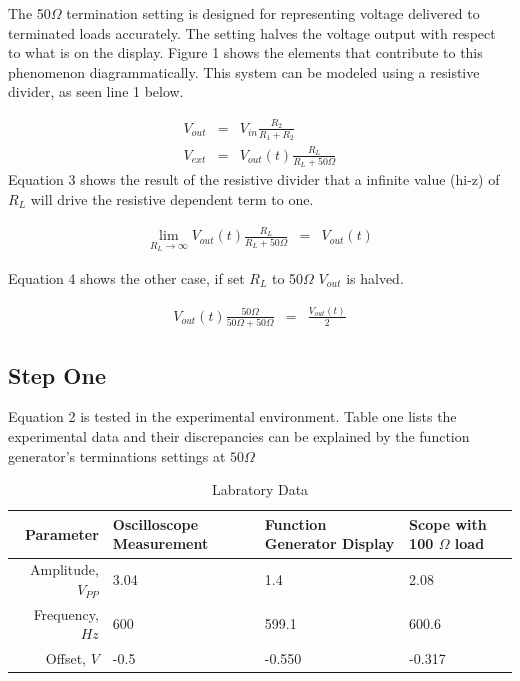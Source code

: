 \documentclass[11pt,journal]{IEEEtran}
\begin{document}
	The 50$\Omega$ termination setting is designed for representing voltage delivered to terminated loads accurately. The setting halves the voltage output 
	with respect to what is on the display. Figure 1 shows the elements that contribute to this phenomenon diagrammatically. This system can be modeled using 
	a resistive divider, as seen line 1 below. 
	
	\begin{eqnarray}
		V_{out} &=& V_{in} \frac{R_2}{R_1 + R_2}\\
		V_{ext} &=& V_{out}(t)\frac{R_L}{R_L + 50\Omega}
	\end{eqnarray}
	Equation 3 shows the result of the resistive divider that a infinite value (hi-z) of $R_L$ will drive the resistive dependent term to one.

	\begin{eqnarray}
		\lim_{R_L \rightarrow \infty} V_{out}(t)\frac{R_L}{R_L + 50\Omega} &=& V_{out}(t)
	\end{eqnarray}
	
	Equation 4 shows the other case, if set $R_L$ to 50$\Omega$ $V_{out}$ is halved. 
	
	\begin{eqnarray}
		V_{out}(t) \frac{50\Omega}{50\Omega + 50\Omega} &=& \frac{V_{out}(t)}{2}
	\end{eqnarray}
	
		\subsection{Step One}
		
			Equation 2 is tested in the experimental environment. Table one lists the 
		experimental data and their discrepancies can be explained by the function generator's
		terminations settings at $50\Omega$
		
		\begin{table}[htpb]
			\renewcommand{\arraystretch}{1.2}
			\caption{Labratory Data}
			
			\label{Team Hour Summary}
			\centering
			\begin{tabular}{r|p{1.7cm}|p{1.8cm}| p{1.5cm}}
			\hline
			\bfseries 	Parameter	 					&  \bf Oscilloscope Measurement			& \bfseries Function Generator Display 		& \bfseries Scope with 100 $\Omega$ load	\\
			\hline\hline
						Amplitude,  $V_{PP}$			& 3.04									& 1.4										& 2.08		\\
						Frequency, $Hz$					& 600									& 599.1										& 600.6		\\	
						Offset, $V$						& -0.5									& -0.550									& -0.317	\\
			\hline
			\end{tabular}
		\end{table}
	
\end{document}
